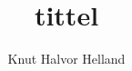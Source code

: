 \documentclass[a4paper,norsk,12pt]{article}
\title{tittel}
\author{Knut Halvor Helland}
\begin{document}
\maketitle{}

      
      




\end{document}
